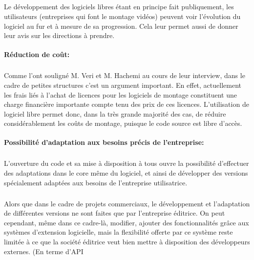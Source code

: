     \subparagraph{ }

    Le développement des logiciels libres étant en principe fait publiquement,
    les utilisateurs (entreprises qui font le montage vidéos) peuvent
    voir l'évolution du logiciel au fur et à mesure de sa progression. Cela leur
    permet aussi de donner leur avis sur les directions à prendre.

  \paragraph{Réduction de coût:}

    \subparagraph{ }

    Comme l'ont souligné  M. Veri et M. Hachemi au cours de leur interview, dans le cadre de petites
    structures c'est un argument important.  En effet,  actuellement les frais liés à l'achat de licences
    pour les logiciels de montage constituent une charge financière importante compte tenu des prix de
    ces licences. L'utilisation de logiciel libre permet donc, dans la très grande majorité des cas, de
    réduire considérablement les coûts de montage, puisque le code source est libre d'accès.

  \paragraph{Possibilité d'adaptation aux besoins précis de l'entreprise:}

    \subparagraph{ }

    L'ouverture du code et sa mise à disposition à tous ouvre la possibilité d'effectuer
    des adaptations dans le core même du logiciel, et ainsi de développer des versions
    spécialement adaptées aux besoins de l'entreprise utilisatrice.

    \subparagraph{ }

    Alors que dans le cadre de projets commerciaux,  le développement et l'adaptation de différentes
    versions ne sont faites que par l'entreprise éditrice. On peut cependant, même dans ce cadre-là,
    modifier, ajouter des fonctionnalités grâce aux systèmes d'extension logicielle, mais la flexibilité
    offerte par ce système reste limitée à ce que la société éditrice veut bien mettre à disposition des
    développeurs externes. (En terme d'API  
